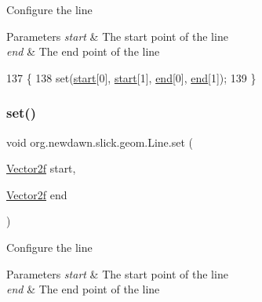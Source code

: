 Configure the line


\begin{DoxyParams}{Parameters}
{\em start} & The start point of the line \\
\hline
{\em end} & The end point of the line \\
\hline
\end{DoxyParams}

\begin{DoxyCode}
137                                                 \{
138         \textcolor{keyword}{set}(\mbox{\hyperlink{classorg_1_1newdawn_1_1slick_1_1geom_1_1_line_aaf3a6c6053990b96a501b80081258f92}{start}}[0], \mbox{\hyperlink{classorg_1_1newdawn_1_1slick_1_1geom_1_1_line_aaf3a6c6053990b96a501b80081258f92}{start}}[1], \mbox{\hyperlink{classorg_1_1newdawn_1_1slick_1_1geom_1_1_line_abc89f3da558e2d29ad48f3c453c25f92}{end}}[0], \mbox{\hyperlink{classorg_1_1newdawn_1_1slick_1_1geom_1_1_line_abc89f3da558e2d29ad48f3c453c25f92}{end}}[1]);
139     \}
\end{DoxyCode}
\mbox{\label{classorg_1_1newdawn_1_1slick_1_1geom_1_1_line_ae8ef21c06c220edb4f1e28c44ae8dca7}} 
\subsubsection{\texorpdfstring{set()}{set()}\hspace{0.1cm}{\footnotesize\ttfamily [2/3]}}
{\footnotesize\ttfamily void org.\+newdawn.\+slick.\+geom.\+Line.\+set (\begin{DoxyParamCaption}\item[{\mbox{\hyperlink{classorg_1_1newdawn_1_1slick_1_1geom_1_1_vector2f}{Vector2f}}}]{start,  }\item[{\mbox{\hyperlink{classorg_1_1newdawn_1_1slick_1_1geom_1_1_vector2f}{Vector2f}}}]{end }\end{DoxyParamCaption})\hspace{0.3cm}{\ttfamily [inline]}}

Configure the line


\begin{DoxyParams}{Parameters}
{\em start} & The start point of the line \\
\hline
{\em end} & The end point of the line \\
\hline
\end{DoxyParams}

